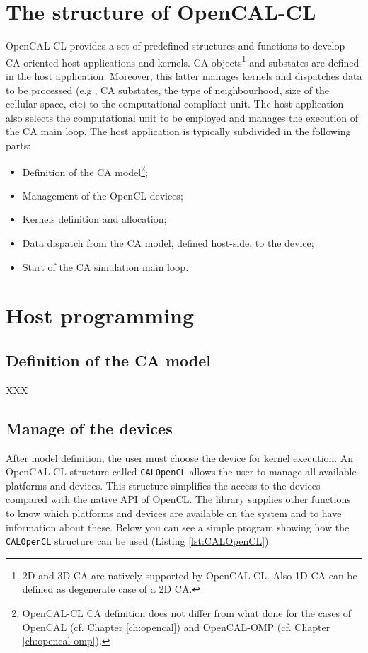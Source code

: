 \section{The structure of OpenCAL-CL}
OpenCAL-CL provides a set of predefined structures and functions to
develop CA oriented host applications and kernels. CA
objects\footnote{2D and 3D CA are natively supported by
  OpenCAL-CL. Also 1D CA can be defined as degenerate case of a 2D
  CA.} and substates are defined in the host application. Moreover,
this latter manages kernels and dispatches data to be processed (e.g.,
CA substates, the type of neighbourhood, size of the cellular space,
etc) to the computational compliant unit. The host application also
selects the computational unit to be employed and manages the
execution of the CA main loop. The host application is typically
subdivided in the following parts:
\begin{itemize}
\item Definition of the CA model\footnote{OpenCAL-CL CA definition
  does not differ from what done for the cases of OpenCAL (cf. Chapter
  \ref{ch:opencal}) and OpenCAL-OMP (cf. Chapter
  \ref{ch:opencal-omp}).};
\item Management of the OpenCL devices;
\item Kernels definition and allocation;
\item Data dispatch from the CA model, defined host-side, to the device;
\item Start of the CA simulation main loop.
\end{itemize}

\section{Host programming} 

\subsection{Definition of the CA model}

XXX

\subsection{Manage of the devices}

After model definition, the user must choose the device for kernel
execution. An OpenCAL-CL structure called \verb'CALOpenCL' allows the
user to manage all available platforms and devices. This structure
simplifies the access to the devices compared with the native API of
OpenCL. The library supplies other functions to know which platforms
and devices are available on the system and to have information about
these. Below you can see a simple program showing how the
\verb'CALOpenCL' structure can be used (Listing \ref{lst:CALOpenCL}).


